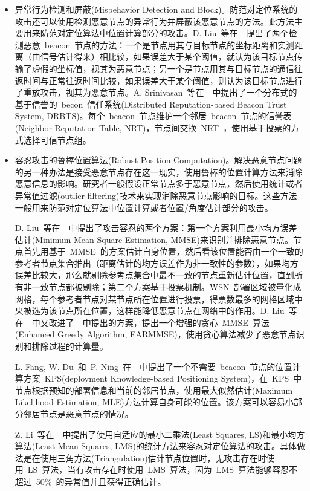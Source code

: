 \documentclass[a4paper,10pt]{article}
\begin{document}
\begin{itemize}
\item 异常行为检测和屏蔽(Misbehavior Detection and Block)。防范对定位系统的攻击还可以使用检测恶意节点的异常行为并屏蔽该恶意节点的方法。此方法主要用来防范对定位算法中位置计算部分的攻击。D. Liu~等在~\cite{Liu2005c}~提出了两个检测恶意~beacon~节点的方法：一个是节点用其与目标节点的坐标距离和实测距离（由信号估计得来）相比较，如果误差大于某个阈值，就认为该目标节点传输了虚假的坐标值，视其为恶意节点；另一个是节点用其与目标节点的通信往返时间与正常往返时间比较，如果误差大于某个阈值，则认为该目标节点进行了重放攻击，视其为恶意节点。A. Srinivasan~等在~\cite{Srinivasan2006}~中提出了一个分布式的基于信誉的~becon~信任系统(Distributed Reputation-based Beacon Trust System, DRBTS)。每个~beacon~节点维护一个邻居~beacon~节点的信誉表(Neighbor-Reputation-Table, NRT)，节点间交换~NRT~，使用基于投票的方式选择可信节点组。

\item 容忍攻击的鲁棒位置算法(Robust Position Computation)。解决恶意节点问题的另一种办法是接受恶意节点存在这一现实，使用鲁棒的位置计算方法来消除恶意信息的影响。研究者一般假设正常节点多于恶意节点，然后使用统计或者异常值过滤(outlier filtering)技术来实现消除恶意节点影响的目标。这些方法一般用来防范对定位算法中位置计算或者位置/角度估计部分的攻击。

D. Liu~等在~\cite{Liu2005b}~中提出了攻击容忍的两个方案：第一个方案利用最小均方误差估计(Minimum Mean Square Estimation, MMSE)来识别并排除恶意节点。节点首先用基于~MMSE~的方案估计自身位置，然后看该位置能否由一个一致的参考者节点集合推出（距离估计的均方误差作为非一致性的参数），如果均方误差比较大，那么就剔除参考点集合中最不一致的节点重新估计位置，直到所有非一致节点都被剔除；第二个方案基于投票机制。WSN~部署区域被量化成网格，每个参考者节点对某节点所在位置进行投票，得票数最多的网格区域中央被选为该节点所在位置，这样能降低恶意节点在网络中的作用。D. Liu~等在~\cite{Liu2008a}~中又改进了~\cite{Liu2005b}~中提出的方案，提出一个增强的贪心~MMSE~算法(Enhanced Greedy Algorithm, EARMMSE)，使用贪心算法减少了恶意节点识别和排除过程的计算量。

L. Fang, W. Du~和~P. Ning~在~\cite{Fang2005}~中提出了一个不需要~beacon~节点的位置计算方案~KPS(deployment Knowledge-based Positioning System)，在~KPS~中节点根据预知的部署信息和当前的邻居节点，使用最大似然估计(Maximum Likelihood Estimation, MLE)方法计算自身可能的位置。该方案可以容易小部分邻居节点是恶意节点的情况。

Z. Li~等在~\cite{Li2005a}~中提出了使用自适应的最小二乘法(Least Squares, LS)和最小均方算法(Least Mean Squares, LMS)的统计方法来容忍对定位算法的攻击。具体做法是在使用三角方法(Triangulation)估计节点位置时，无攻击存在时使用~LS~算法，当有攻击存在时使用~LMS~算法，因为~LMS~算法能够容忍不超过~50\%~的异常值并且获得正确估计。


\end{itemize}
\end{document}
